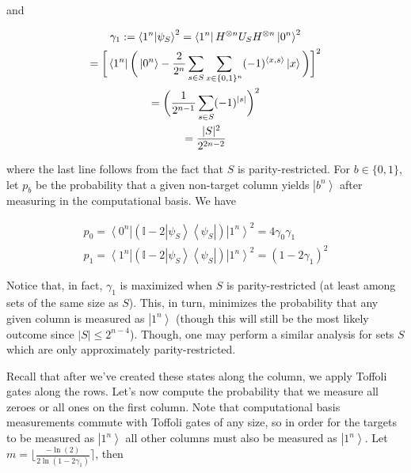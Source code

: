 \documentclass[10pt,a4paper]{article}
\begin{document}
and\par


\[\begin{gathered}
\displaystyle\gamma_{1}:=\left\langle 1^{n}\middle|\psi_{S}\right\rangle^{2} \displaystyle=\left\langle 1^{n}\right|H^{\otimes n}U_{S}H^{\otimes n}\left|0^{n}\right\rangle^{2} \\
\displaystyle=\bigg{[}\left\langle 1^{n}\right|\bigg{(}\left|0^{n}\right\rangle-\frac{2}{2^{n}}\sum_{s\in S}\sum_{x\in\{0,1\}^{n}}(-1)^{\langle x,s\rangle}\left|x\right\rangle\bigg{)}\bigg{]}^{2} \\
\displaystyle=\bigg{(}\frac{1}{2^{n-1}}\sum_{s\in S}(-1)^{|s|}\bigg{)}^{2} \\
\displaystyle=\frac{|S|^{2}}{2^{2n-2}}
\end{gathered}\]


where the last line follows from the fact that $S$ is parity-restricted. For $b\in\{0,1\}$, let $p_{b}$ be the probability that a given non-target column yields $\left|b^{n}\right\rangle$ after measuring in the computational basis. We have\par


\[\begin{gathered}
\displaystyle p_{0} \displaystyle=\left\langle 0^{n}\right|(\mathbb{I}-2\left|\psi_{S}\right\rangle\!\left\langle\psi_{S}\right|)\left|1^{n}\right\rangle^{2}=4\gamma_{0}\gamma_{1} \\
\displaystyle p_{1} \displaystyle=\left\langle 1^{n}\right|(\mathbb{I}-2\left|\psi_{S}\right\rangle\!\left\langle\psi_{S}\right|)\left|1^{n}\right\rangle^{2}=(1-2\gamma_{1})^{2}
\end{gathered}\]


Notice that, in fact, $\gamma_{1}$ is maximized when $S$ is parity-restricted (at least among sets of the same size as $S$). This, in turn, minimizes the probability that any given column is measured as $\left|1^{n}\right\rangle$ (though this will still be the most likely outcome since $|S|\leq 2^{n-4}$). Though, one may perform a similar analysis for sets $S$ which are only approximately parity-restricted.\par




Recall that after we’ve created these states along the column, we apply Toffoli gates along the rows. Let’s now compute the probability that we measure all zeroes or all ones on the first column. Note that computational basis measurements commute with Toffoli gates of any size, so in order for the targets to be measured as $\left|1^{n}\right\rangle$ all other columns must also be measured as $\left|1^{n}\right\rangle$. Let $m=\lfloor\frac{-\ln(2)}{2\ln(1-2\gamma_{1})}\rceil$, then\par
\end{document}

